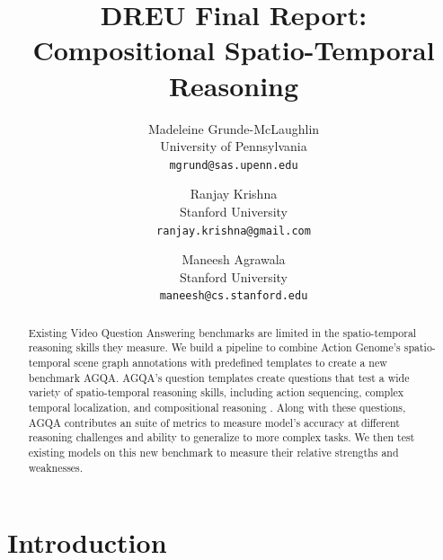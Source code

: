 \documentclass[10pt,twocolumn,letterpaper]{article}
\newcommand{\mgm}[1]{{\color{cyan}{mgm: #1}}}
\begin{document}
\title{DREU Final Report: Compositional Spatio-Temporal Reasoning}

\author{Madeleine Grunde-McLaughlin\\
University of Pennsylvania\\
{\tt\small mgrund@sas.upenn.edu}

\and
Ranjay Krishna\\
Stanford University\\
{\tt\small ranjay.krishna@gmail.com}

\and
Maneesh Agrawala\\
Stanford University\\
{\tt\small maneesh@cs.stanford.edu}


}
\maketitle
\pagestyle{empty}

\begin{abstract}
    Existing Video Question Answering benchmarks are limited in the spatio-temporal reasoning skills they measure. We build a pipeline to combine Action Genome's spatio-temporal scene graph annotations with predefined templates to create a new benchmark AGQA. AGQA's question templates create questions that test a wide variety of spatio-temporal reasoning skills, including action sequencing, complex temporal localization, and compositional reasoning \mgm{re-think this list and what is included}. Along with these questions, AGQA contributes an suite of metrics to measure model's accuracy at different reasoning challenges and ability to generalize to more complex tasks. We then test existing models on this new benchmark to measure their relative strengths and weaknesses. \mgm{add results}

\end{abstract}



\section{Introduction}
\end{document}

